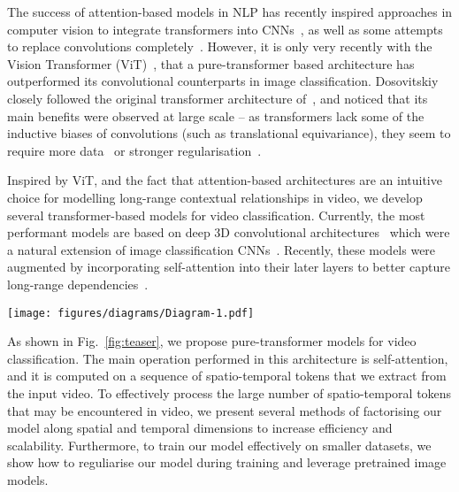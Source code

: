 \documentclass[10pt,twocolumn,letterpaper]{article}
\begin{document}
The success of attention-based models in NLP has recently inspired approaches in computer vision to integrate transformers into CNNs~\cite{wang_cvpr_2018, carion_eccv_2020}, as well as some attempts to replace convolutions completely~\cite{parmar_icml_2018, ramachandran_neurips_2019}. 
However, it is only very recently with the Vision Transformer (ViT)~\cite{dosovitskiy_iclr_2021}, that a pure-transformer based architecture has outperformed its convolutional counterparts in image classification.
Dosovitskiy~\etal~\cite{dosovitskiy_iclr_2021} closely followed the original transformer architecture of~\cite{vaswani_neurips_2017}, and noticed that its main benefits were observed at large scale -- as transformers lack some of the inductive biases of convolutions (such as translational equivariance), they seem to require more data~\cite{dosovitskiy_iclr_2021} or stronger regularisation~\cite{touvron_arxiv_2020}.


Inspired by ViT, and the fact that attention-based architectures are an intuitive choice for modelling long-range contextual relationships in video, we develop several transformer-based models for video classification.
Currently, the most performant models are based on deep 3D convolutional architectures~\cite{carreira_cvpr_2017, feichtenhofer_cvpr_2020, feichtenhofer_iccv_2019} which were a natural extension of image classification CNNs~\cite{he_cvpr_2016, szegedy_cvpr_2015}.
Recently, these models were augmented by incorporating self-attention into their later layers to better capture long-range dependencies~\cite{wang_cvpr_2018, girdhar_cvpr_2019, wu_cvpr_2019}.

\begin{figure*}
    \centering
    \texttt{[image: figures/diagrams/Diagram-1.pdf]}
	\caption{
		We propose a pure-transformer architecture for video classification, inspired by the recent success of such models for images~\cite{dosovitskiy_iclr_2021}.
		To effectively process a large number of spatio-temporal tokens, we develop several model variants which factorise different components of the transformer encoder over the spatial- and temporal-dimensions.
		As shown on the right, these factorisations correspond to different attention patterns over space and time.
	}
	\vspace{-3mm}
    \label{fig:teaser}
\end{figure*} 


As shown in Fig.~\ref{fig:teaser}, we propose pure-transformer models for video classification.
The main operation performed in this architecture is self-attention, and it is computed on a sequence of spatio-temporal tokens that we extract from the input video.
To effectively process the large number of spatio-temporal tokens that may be encountered in video, we present several methods of factorising our model along spatial and temporal dimensions to increase efficiency and scalability.
Furthermore, to train our model effectively on smaller datasets, we show how to reguliarise our model during training and leverage pretrained image models.
\end{document}

